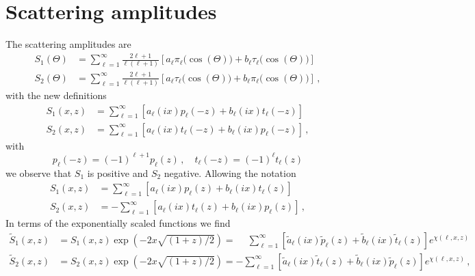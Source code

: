 \documentclass[onecolumn%
              ,superscriptaddress%
              ,aps%
              ,pra]{revtex4}
\begin{document}
\section{Scattering amplitudes}
The scattering amplitudes are
\begin{equation}
\begin{aligned}
S_1(\Theta) &= \sum_{\ell=1}^\infty \frac{2\ell+1}{\ell(\ell+1)}
    \left[ a_\ell\pi_\ell\big(\cos(\Theta)\big) + b_\ell\tau_\ell\big(\cos(\Theta)\big)\right]\\
S_2(\Theta) &= \sum_{\ell=1}^\infty \frac{2\ell+1}{\ell(\ell+1)}
    \left[ a_\ell\tau_\ell\big(\cos(\Theta)\big) + b_\ell\pi_\ell\big(\cos(\Theta)\big)\right]\,,
\end{aligned}
\end{equation}
with the new definitions
\begin{equation}
\begin{aligned}
S_1(x, z) &= \sum_{\ell=1}^\infty 
    \left[ a_\ell(ix) p_\ell(-z) + b_\ell(ix) t_\ell(-z)\right]\\
S_2(x, z) &= \sum_{\ell=1}^\infty \left[ a_\ell(i x) t_\ell(-z) + b_\ell(i x) p_\ell(-z)\right]\,,
\end{aligned}
\end{equation}
with
\begin{equation}
p_\ell(-z) = (-1)^{\ell+1} p_\ell(z)\,,\quad t_\ell(-z) = (-1)^{\ell} t_\ell(z)
\end{equation}
we observe that $S_1$ is positive and $S_2$ negative.
Allowing the notation
\begin{equation}
\begin{aligned}
S_1(x, z) &= \sum_{\ell=1}^\infty 
    \left[ a_\ell(ix) p_\ell(z) + b_\ell(ix) t_\ell(z)\right]\\
S_2(x, z) &= -\sum_{\ell=1}^\infty \left[ a_\ell(i x) t_\ell(z) + b_\ell(i x) p_\ell(z)\right]\,,
\end{aligned}
\end{equation}
In terms of the exponentially scaled functions we find
\begin{equation}
\begin{aligned}
\tilde S_1(x, z) &= S_1(x, z) \exp(-2x\sqrt{(1+z)/2}) = \phantom{-}\sum_{\ell=1}^\infty 
    \left[ \tilde a_\ell(ix) \tilde p_\ell(z) +  \tilde b_\ell(ix) \tilde t_\ell(z)\right]e^{\chi(\ell,x,z)}\\
\tilde S_2(x, z) &= S_2(x, z) \exp(-2x\sqrt{(1+z)/2}) =-\sum_{\ell=1}^\infty \left[\tilde a_\ell(i x)\tilde t_\ell(z) +\tilde b_\ell(i x)\tilde p_\ell(z)\right]e^{\chi(\ell,x,z)}\,,
\end{aligned}
\end{equation}
\end{document}
